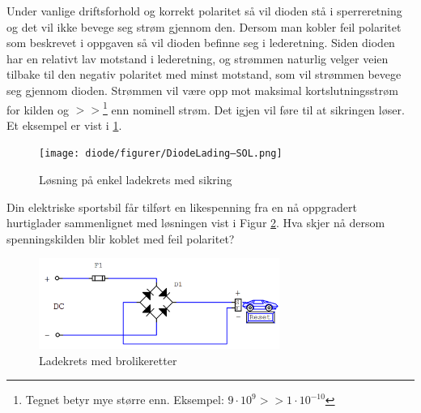 \vspace{0.5cm} %

\begin{solution}[name=Løsningsforslag oppgave]
	
Under vanlige driftsforhold og korrekt polaritet så vil dioden stå i sperreretning og det vil ikke bevege seg strøm gjennom den. Dersom man kobler feil polaritet som beskrevet i oppgaven så vil dioden befinne seg i lederetning. Siden dioden har en relativt lav motstand i lederetning, og strømmen naturlig velger veien tilbake til den negativ polaritet med minst motstand, som vil strømmen bevege seg gjennom dioden. Strømmen vil være opp mot maksimal kortslutningsstrøm for kilden og $>>$\footnote{Tegnet betyr mye større enn. Eksempel: $9\cdot10^{9}>>1\cdot10^{-10}$} enn nominell strøm. Det igjen vil føre til at sikringen løser. Et eksempel er vist i \ref{fig:diodeLadingSol}.
	\begin{figure}[H]
	\centering
	\texttt{[image: diode/figurer/DiodeLading–SOL.png]}
	\caption{Løsning på enkel ladekrets med sikring}
	\label{fig:diodeLadingSol}
\end{figure}

	
\end{solution}




\begin{question}[name=Oppgave, topic=dioder]
	Din elektriske sportsbil får tilført en likespenning fra en nå oppgradert hurtiglader sammenlignet med løsningen vist i Figur \ref{fig:diodeLading}. Hva skjer nå dersom spenningskilden blir koblet med feil polaritet?
	
	\begin{figure}[H]
		\centering
		\includegraphics[width=0.7\textwidth]{diode/figurer/GretzLading.png}
		\caption{Ladekrets med brolikeretter}
		\label{fig:diodeLading}
	\end{figure}
	
\end{question}

\vspace{0.5cm} %

